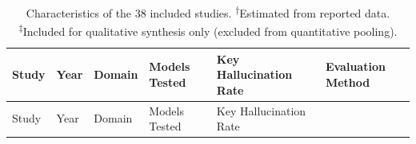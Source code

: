 \documentclass[
  11pt,
  a4paper,
]{article}
\begin{document}
\begin{longtable}[]{@{}
  >{\raggedright\arraybackslash}p{}
  >{\raggedright\arraybackslash}p{}
  >{\raggedright\arraybackslash}p{}
  >{\raggedright\arraybackslash}p{}
  >{\raggedright\arraybackslash}p{}
  >{\raggedright\arraybackslash}p{}@{}}
\caption{Characteristics of the 38 included studies.
\textsuperscript{†}Estimated from reported data.
\textsuperscript{‡}Included for qualitative synthesis only (excluded
from quantitative pooling).}\label{tbl-studies}\tabularnewline
\toprule\noalign{}
\begin{minipage}[b]{\linewidth}\raggedright
Study
\end{minipage} & \begin{minipage}[b]{\linewidth}\raggedright
Year
\end{minipage} & \begin{minipage}[b]{\linewidth}\raggedright
Domain
\end{minipage} & \begin{minipage}[b]{\linewidth}\raggedright
Models Tested
\end{minipage} & \begin{minipage}[b]{\linewidth}\raggedright
Key Hallucination Rate
\end{minipage} & \begin{minipage}[b]{\linewidth}\raggedright
Evaluation Method
\end{minipage} \\
\midrule\noalign{}
\endfirsthead
\toprule\noalign{}
\begin{minipage}[b]{\linewidth}\raggedright
Study
\end{minipage} & \begin{minipage}[b]{\linewidth}\raggedright
Year
\end{minipage} & \begin{minipage}[b]{\linewidth}\raggedright
Domain
\end{minipage} & \begin{minipage}[b]{\linewidth}\raggedright
Models Tested
\end{minipage} & \begin{minipage}[b]{\linewidth}\raggedright
Key Hallucination Rate
\end{minipage} & \begin{minipage}[b]{\linewidth}\raggedright

\end{minipage}
\end{longtable}
\end{document}

